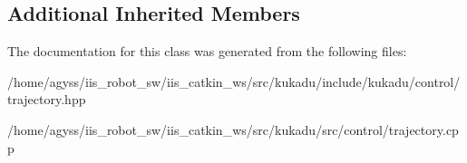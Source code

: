 \subsection*{Additional Inherited Members}


The documentation for this class was generated from the following files\+:\begin{DoxyCompactItemize}
\item 
/home/agyss/iis\+\_\+robot\+\_\+sw/iis\+\_\+catkin\+\_\+ws/src/kukadu/include/kukadu/control/trajectory.\+hpp\item 
/home/agyss/iis\+\_\+robot\+\_\+sw/iis\+\_\+catkin\+\_\+ws/src/kukadu/src/control/trajectory.\+cpp\end{DoxyCompactItemize}
